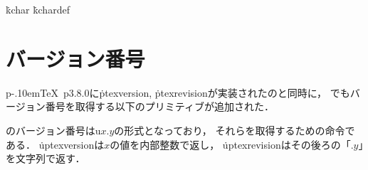 \documentclass[uplatex,a4paper,11pt,nomag]{jsarticle}
\def\pTeX{p\kern-.10em\TeX}
\begin{document}
\.{kchar}
\.{kchardef}



\section{バージョン番号}

\pTeX~p3.8.0に\.{ptexversion}, \.{ptexrevision}が実装されたのと同時に，
\upTeX でもバージョン番号を取得する以下のプリミティブが追加された．

\begin{cslist}
  \upTeX のバージョン番号はu$x{.}y$の形式となっており，
  それらを取得するための命令である．
  \.{uptexversion}は$x$の値を内部整数で返し，
  \.{uptexrevision}はその後ろの「${.}y$」を文字列で返す．
\end{cslist}


\newpage


\begin{thebibliography}{99}
\end{thebibliography}

\newpage
\printindex
\end{document}

